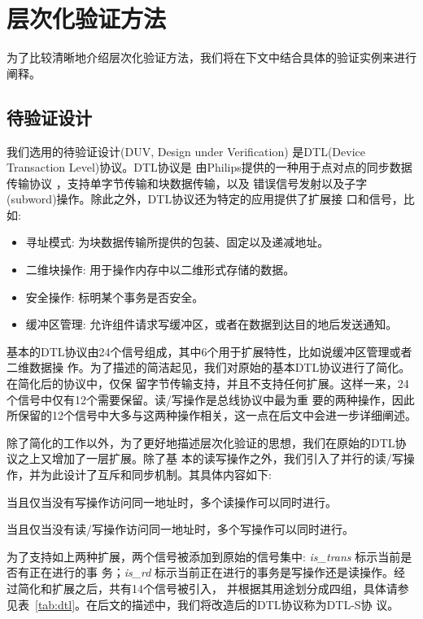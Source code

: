 \section{层次化验证方法}
\label{sec:hierarchy-details}
为了比较清晰地介绍层次化验证方法，我们将在下文中结合具体的验证实例来进行阐释。

\subsection{待验证设计}
\label{sec:hierarchy-duv}

我们选用的待验证设计(DUV, Design under Verification) 是DTL(Device Transaction Level)协议。DTL协议是
由Philips提供的一种用于点对点的同步数据传输协议 \cite{DATE09_Moll}，支持单字节传输和块数据传输，以及
错误信号发射以及子字(subword)操作。除此之外，DTL协议还为特定的应用提供了扩展接
口和信号，比如:

\begin{itemize}
  \item 寻址模式: 为块数据传输所提供的包装、固定以及递减地址。
  \item 二维块操作: 用于操作内存中以二维形式存储的数据。
  \item 安全操作: 标明某个事务是否安全。
  \item 缓冲区管理: 允许组件请求写缓冲区，或者在数据到达目的地后发送通知。
\end{itemize}

基本的DTL协议由24个信号组成，其中6个用于扩展特性，比如说缓冲区管理或者二维数据操
作\cite{Book_Pasricha}。为了描述的简洁起见，我们对原始的基本DTL协议进行了简化。在简化后的协议中，仅保
留字节传输支持，并且不支持任何扩展。这样一来，24个信号中仅有12个需要保留。读/写操作是总线协议中最为重
要的两种操作，因此所保留的12个信号中大多与这两种操作相关，这一点在后文中会进一步详细阐述。

除了简化的工作以外，为了更好地描述层次化验证的思想，我们在原始的DTL协议之上又增加了一层扩展。除了基
本的读写操作之外，我们引入了并行的读/写操作，并为此设计了互斥和同步机制。其具体内容如下:

\begin{extension} \label{extension:multi-read}
当且仅当没有写操作访问同一地址时，多个读操作可以同时进行。
\end{extension}
\begin{extension} \label{extension:multi-write}
当且仅当没有读/写操作访问同一地址时，多个写操作可以同时进行。
\end{extension}


为了支持如上两种扩展，两个信号被添加到原始的信号集中: {\em is\_trans} 标示当前是否有正在进行的事
务；{\em is\_rd} 标示当前正在进行的事务是写操作还是读操作。经过简化和扩展之后，共有14个信号被引入，
并根据其用途划分成四组，具体请参见表~\ref{tab:dtl}。在后文的描述中，我们将改造后的DTL协议称为DTL-S协
议。

